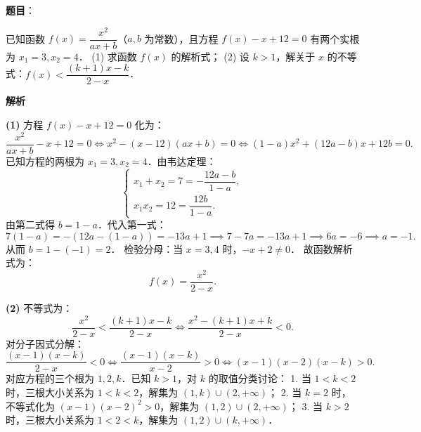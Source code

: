 \begin{answer}

\textbf{题目}：

已知函数 $f(x) = \dfrac{x^2}{ax + b}$（$a, b$ 为常数），且方程 $f(x) - x + 12 = 0$ 有两个实根为 $x_1 = 3, x_2 = 4$．
(1) 求函数 $f(x)$ 的解析式；
(2) 设 $k > 1$，解关于 $x$ 的不等式：$f(x) < \dfrac{(k+1)x - k}{2-x}$．

\textbf{解析}

\textbf{(1)}
方程 $f(x) - x + 12 = 0$ 化为：
\nopagebreak[4]
\[
\dfrac{x^2}{ax + b} - x + 12 = 0 \iff x^2 - (x - 12)(ax + b) = 0 \iff (1 - a)x^2 + (12a - b)x + 12b = 0.
\]
已知方程的两根为 $x_1 = 3, x_2 = 4$．由韦达定理：
\nopagebreak[4]
\[
\begin{cases} x_1 + x_2 = 7 = -\dfrac{12a - b}{1 - a}, \\ x_1 x_2 = 12 = \dfrac{12b}{1 - a}. \end{cases}
\]
由第二式得 $b = 1 - a$．代入第一式：
\nopagebreak[4]
\[
7(1 - a) = -(12a - (1 - a)) = -13a + 1 \implies 7 - 7a = -13a + 1 \implies 6a = -6 \implies a = -1.
\]
从而 $b = 1 - (-1) = 2$．
检验分母：当 $x = 3, 4$ 时，$-x + 2 \neq 0$．
故函数解析式为：
\nopagebreak[4]
\[
f(x) = \dfrac{x^2}{2 - x}.
\]

\textbf{(2)}
不等式为：
\nopagebreak[4]
\[
\dfrac{x^2}{2 - x} < \dfrac{(k+1)x - k}{2 - x} \iff \dfrac{x^2 - (k+1)x + k}{2 - x} < 0.
\]
对分子因式分解：
\nopagebreak[4]
\[
\dfrac{(x - 1)(x - k)}{2 - x} < 0 \iff \dfrac{(x - 1)(x - k)}{x - 2} > 0 \iff (x - 1)(x - 2)(x - k) > 0.
\]
对应方程的三个根为 $1, 2, k$．已知 $k > 1$，对 $k$ 的取值分类讨论：
1. 当 $1 < k < 2$ 时，三根大小关系为 $1 < k < 2$，解集为 $(1, k) \cup (2, +\infty)$；
2. 当 $k = 2$ 时，不等式化为 $(x - 1)(x - 2)^2 > 0$，解集为 $(1, 2) \cup (2, +\infty)$；
3. 当 $k > 2$ 时，三根大小关系为 $1 < 2 < k$，解集为 $(1, 2) \cup (k, +\infty)$．



\end{answer}
